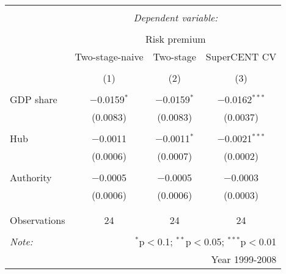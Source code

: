 
\begin{table}[!htbp] \centering 
  \caption{} 
  \label{} 
\begin{tabular}{@{\extracolsep{5pt}}lccc} 
\\[-1.8ex]\hline 
\hline \\[-1.8ex] 
 & \multicolumn{3}{c}{\textit{Dependent variable:}} \\ 
\cline{2-4} 
\\[-1.8ex] & \multicolumn{3}{c}{Risk premium} \\ 
 & Two-stage-naive & Two-stage & SuperCENT CV \\ 
\\[-1.8ex] & (1) & (2) & (3)\\ 
\hline \\[-1.8ex] 
 GDP share & $-$0.0159$^{*}$ & $-$0.0159$^{*}$ & $-$0.0162$^{***}$ \\ 
  & (0.0083) & (0.0083) & (0.0037) \\ 
  & & & \\ 
 Hub & $-$0.0011 & $-$0.0011$^{*}$ & $-$0.0021$^{***}$ \\ 
  & (0.0006) & (0.0007) & (0.0002) \\ 
  & & & \\ 
 Authority & $-$0.0005 & $-$0.0005 & $-$0.0003 \\ 
  & (0.0006) & (0.0006) & (0.0003) \\ 
  & & & \\ 
\hline \\[-1.8ex] 
Observations & 24 & 24 & 24 \\ 
\hline 
\hline \\[-1.8ex] 
\textit{Note:}  & \multicolumn{3}{r}{$^{*}$p$<$0.1; $^{**}$p$<$0.05; $^{***}$p$<$0.01} \\ 
 & \multicolumn{3}{r}{Year 1999-2008} \\ 
\end{tabular} 
\end{table} 
